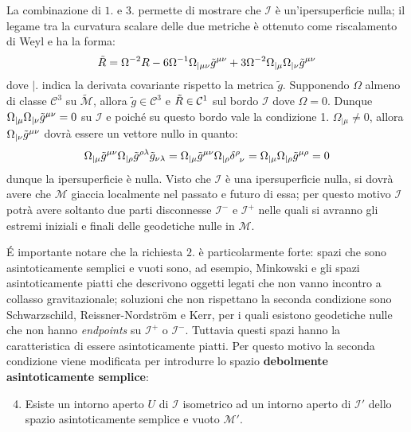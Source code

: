 La combinazione di $1.$ e $3.$ permette di mostrare che $\mathcal{I}$ è un'ipersuperficie nulla; il legame tra la curvatura scalare delle due metriche è ottenuto come riscalamento di Weyl \cite{wald}\cite{hawking} e ha la forma:
\begin{equation*}
    \Tilde{R} = \Omega^{-2}R - 6\Omega^{-1}\Omega_{|\mu\nu}\Tilde{g}^{\mu\nu} + 3\Omega^{-2}\Omega_{|\mu}\Omega_{|\nu}\Tilde{g}^{\mu\nu}
\end{equation*}
dove $|.$ indica la derivata covariante rispetto la metrica $\tilde{g}$. Supponendo $\Omega$ almeno di classe $\mathcal{C}^3$ su $\tilde{\mathcal{M}}$, allora $\tilde{g} \in \mathcal{C}^3$ e $\Tilde{R} \in \mathcal{C}^1$ sul bordo $\mathcal{I}$ dove $\Omega = 0$. Dunque $\Omega_{|\mu}\Omega_{|\nu}\Tilde{g}^{\mu\nu} = 0$ su $\mathcal{I}$ e poiché su questo bordo vale la condizione 1. $\Omega_{|\mu} \neq 0$, allora $\Omega_{|\nu}\Tilde{g}^{\mu\nu}$ dovrà essere un vettore nullo in quanto:
\begin{equation*}
    \Omega_{|\mu}\Tilde{g}^{\mu\nu}\Omega_{|\rho} \tilde{g}^{\rho\lambda} \Tilde{g}_{\nu\lambda} = \Omega_{|\mu}\Tilde{g}^{\mu\nu}\Omega_{|\rho}\tensor{\delta}{^\rho_\nu} = \Omega_{|\mu}\Omega_{|\rho}\Tilde{g}^{\mu\rho} = 0
\end{equation*}
dunque la ipersuperficie è nulla. Visto che $\mathcal{I}$ è una ipersuperficie nulla, si dovrà avere che $\mathcal{M}$  giaccia localmente nel passato e futuro di essa; per questo motivo $\mathcal{I}$ potrà avere soltanto due parti disconnesse $\mathcal{I}^-$ e $\mathcal{I}^+$ nelle quali si avranno gli estremi iniziali e finali delle geodetiche nulle in $\mathcal{M}$.

\'E importante notare che la richiesta $2.$ è particolarmente forte: spazi che sono asintoticamente semplici e vuoti sono, ad esempio, Minkowski e gli spazi asintoticamente piatti che descrivono oggetti legati che non vanno incontro a collasso gravitazionale; soluzioni che non rispettano la seconda condizione sono Schwarzschild, Reissner-Nordstr\"om e Kerr, per i quali esistono geodetiche nulle che non hanno \textit{endpoints} su $\mathcal{I}^+$ o $\mathcal{I}^-$. Tuttavia questi spazi hanno la caratteristica di essere asintoticamente piatti. Per questo motivo la seconda condizione viene modificata per introdurre lo spazio \textbf{debolmente asintoticamente semplice}:
\begin{enumerate}
\setcounter{enumi}{3}
\item Esiste un intorno aperto $U$ di $\mathcal{I}$ isometrico ad un intorno aperto di $\mathcal{I}'$ dello spazio asintoticamente semplice e vuoto $\mathcal{M}'$.
\end{enumerate}

